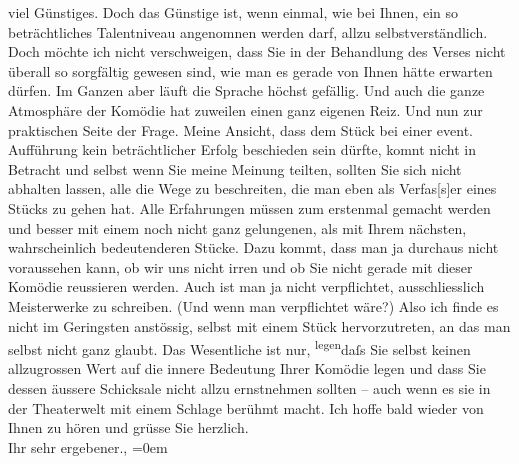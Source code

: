 \begin{ledgroupsized}[t]{13cm}
               viel Günstiges. Doch das Günstige ist, wenn einmal, wie bei Ihnen, ein so
               beträchtliches Talentniveau angenomnen werden darf, allzu selbstverständlich. Doch
               möchte ich nicht verschweigen, dass Sie in der Behandlung des Verses nicht überall so
               sorgfältig gewesen sind, wie man es gerade von Ihnen hätte erwarten dürfen. Im Ganzen
               aber läuft die Sprache höchst gefällig. Und auch die ganze Atmosphäre der Komödie hat
               zuweilen einen ganz eigenen Reiz.\pend
           \pstart
           Und nun zur praktischen Seite der Frage. Meine Ansicht, dass dem Stück bei einer event. Aufführung kein
               beträchtlicher Erfolg beschieden sein dürfte, komnt nicht in Betracht und selbst wenn
               Sie meine Meinung teilten, sollten Sie sich nicht abhalten lassen, alle die Wege zu
               beschreiten, die man eben als Verfas{[}s{]}er eines Stücks zu gehen
               hat. Alle Erfahrungen müssen zum {\pb}erstenmal gemacht
               werden und besser mit einem noch nicht ganz gelungenen, als mit Ihrem nächsten,
               wahrscheinlich bedeutenderen Stücke. Dazu kommt, dass man ja durchaus nicht
               voraussehen kann, ob wir uns nicht irren und ob Sie nicht gerade mit dieser Komödie
                  reussieren werden. Auch ist man ja nicht
               verpflichtet, ausschliesslich Meisterwerke zu schreiben. (Und wenn man verpflichtet
               wäre?) Also ich finde es nicht im Geringsten anstössig, selbst mit einem Stück
               hervorzutreten, an das man selbst nicht ganz glaubt. Das Wesentliche ist nur, \substVorne{}\textsuperscript{legen}\substDazwischen{}daſs\substHinten{} Sie selbst keinen allzugrossen Wert auf die innere Bedeutung Ihrer Komödie legen und dass Sie
               dessen äussere Schicksale nicht allzu ernstnehmen sollten – auch wenn es sie in der
               Theaterwelt mit einem Schlage berühmt macht.\pend
           \pstart
           Ich hoffe bald wieder von Ihnen zu hören und grüsse Sie herzlich.{\\[\baselineskip]} Ihr sehr
               ergebener.,\pend
           \leftskip=0em{}
         
         \endnumbering{}\end{ledgroupsized}  \newcommand{\dateiname}{L01635}\newcommand{\titel}{Arthur Schnitzler an Max Mell, 26. 10. 1906}\newcommand{\editorInnen}{Martin Anton Müller und Gerd-Hermann Susen}
      